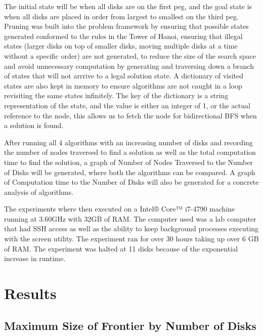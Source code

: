 \documentclass[conference]{IEEEtran}
\begin{document}
The initial state will be when all disks are on the first peg, and the goal state is when all disks are placed in order from largest to smallest on the third peg. Pruning was built into the problem framework by ensuring that possible states generated conformed to the rules in the Tower of Hanoi, ensuring that illegal states (larger disks on top of smaller disks, moving multiple disks at a time without a specific order) are not generated, to reduce the size of the search space and avoid unnecessary computation by generating and traversing down a branch of states that will not arrrive to a legal solution state. A dictionary of visited states are also kept in memory to ensure algorithms are not caught in a loop revisiting the same states infinitely. The key of the dictionary is a string representation of the state, and the value is either an integer of 1, or the actual reference to the node, this allows us to fetch the node for bidirectional BFS when a solution is found.

After running all 4 algorithms with an increasing number of disks and recording the number of nodes traversed to find a solution as well as the total computation time to find the solution, a graph of Number of Nodes Traversed to the Number of Disks will be generated, where both the algorithms can be compared. A graph of Computation time to the Number of Disks will also be generated for a concrete analysis of algorithms.

The experiments where then executed on a Intel® Core™ i7-4790 machine running at 3.60GHz with 32GB of RAM. The computer used was a lab computer that had SSH access as well as the ability to keep background processes executing with the screen utility. The experiment ran for over 30 hours taking up over 6 GB of RAM. The experiment was halted at 11 disks because of the exponential increase in runtime.

\section{Results}

\subsection{Maximum Size of Frontier by Number of Disks}
\end{document}

